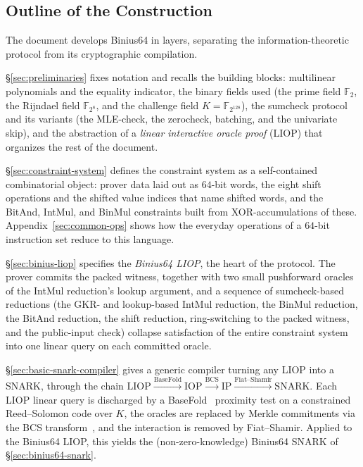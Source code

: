 \documentclass{article}
\theoremstyle{definition}
\newcommand{\FF}[1]{\mathbb{F}_{#1}}
\begin{document}
\subsection{Outline of the Construction}

The document develops Binius64 in layers, separating the information-theoretic protocol from its cryptographic compilation.

\S\ref{sec:preliminaries} fixes notation and recalls the building blocks: multilinear polynomials and the equality indicator, the binary fields used (the prime field $\FF{2}$, the Rijndael field $\FF{2^8}$, and the challenge field $K = \FF{2^{128}}$), the sumcheck protocol and its variants (the MLE-check, the zerocheck, batching, and the univariate skip), and the abstraction of a \emph{linear interactive oracle proof} (LIOP) that organizes the rest of the document.

\S\ref{sec:constraint-system} defines the constraint system as a self-contained combinatorial object: prover data laid out as $64$-bit words, the eight shift operations and the shifted value indices that name shifted words, and the BitAnd, IntMul, and BinMul constraints built from XOR-accumulations of these. Appendix~\ref{sec:common-ops} shows how the everyday operations of a $64$-bit instruction set reduce to this language.

\S\ref{sec:binius-liop} specifies the \emph{Binius64 LIOP}, the heart of the protocol. The prover commits the packed witness, together with two small pushforward oracles of the IntMul reduction's lookup argument, and a sequence of sumcheck-based reductions (the GKR- and lookup-based IntMul reduction, the BinMul reduction, the BitAnd reduction, the shift reduction, ring-switching to the packed witness, and the public-input check) collapse satisfaction of the entire constraint system into one linear query on each committed oracle.

\S\ref{sec:basic-snark-compiler} gives a generic compiler turning any LIOP into a SNARK, through the chain $\text{LIOP} \xrightarrow{\text{BaseFold}} \text{IOP} \xrightarrow{\text{BCS}} \text{IP} \xrightarrow{\text{Fiat--Shamir}} \text{SNARK}$. Each LIOP linear query is discharged by a BaseFold~\cite{Zeilberger:2024aa} proximity test on a constrained Reed--Solomon code over $K$, the oracles are replaced by Merkle commitments via the BCS transform~\cite{Ben-Sasson:2016aa}, and the interaction is removed by Fiat--Shamir. Applied to the Binius64 LIOP, this yields the (non-zero-knowledge) Binius64 SNARK of \S\ref{sec:binius64-snark}.
\end{document}
